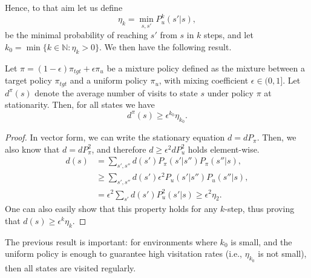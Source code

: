 Hence, to that aim let us define
\[\eta_{k} = \min_{s,s'} P_u^{k}(s'|s),\] be the minimal probability of reaching $s'$ from $s$ in $k$ steps, and let $k_0= \min\{k \in \mathbb{N}: \eta_k >0\}$. We then have the following result. 
\begin{tcolorbox}
\begin{lemma}
\label{lemma:lower_bound_visits}
Let $\pi=(1-\epsilon)\pi_{tgt} + \epsilon\pi_u$ be a mixture policy defined as the mixture between a target policy $\pi_{tgt}$ and a uniform policy $\pi_u$, with mixing coefficient $\epsilon \in (0,1]$. 
Let $d^\pi(s)$ denote the average number of visits to state $s$ under policy $\pi$ at stationarity. Then, for all states we have
\begin{equation}
d^\pi(s) \geq \epsilon^{k_0} \eta_{k_0}.
\end{equation}
\end{lemma}
\end{tcolorbox}
\begin{proof}
In vector form, we can write the stationary equation $d= d P_\pi$. Then, we also know that $d = d P_\pi^2$, and therefore $d\geq \epsilon^2 d P_u^2$ holds element-wise.
\begin{align*}
d(s) &= \sum_{s',s''} d(s') P_\pi(s'|s'')P_\pi(s''|s),\\
&\geq \sum_{s',s''}d(s')\epsilon^2 P_u(s'|s'') P_u(s''|s),\\
&= \epsilon^2  \sum_{s'}d(s')P_u^2(s'|s) \geq \epsilon^2 \eta_2.
\end{align*}
One can also easily show that this property holds for any $k$-step, thus proving that $d(s)\geq \epsilon^k \eta_k$.
\end{proof}
The previous result is important: for environments where $k_0$ is small, and the uniform policy is enough to guarantee high visitation rates (i.e., $\eta_{k_0}$ is not small), then all states are visited regularly.



